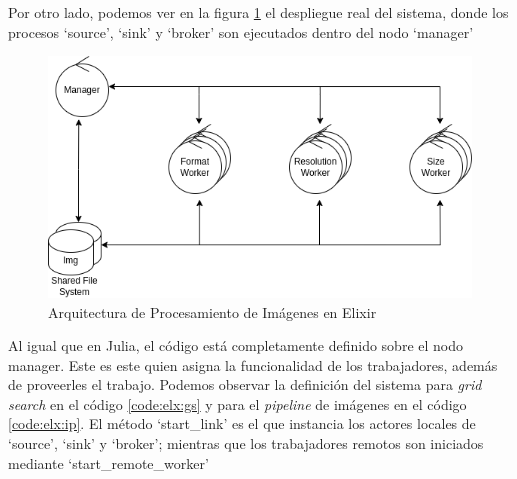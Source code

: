 \documentclass[11pt]{article}
\begin{document}
Por otro lado, podemos ver en la figura \ref{fig:elx:image_processing_arch} el despliegue real del sistema, donde los procesos `source', `sink' y `broker' son ejecutados dentro del nodo `manager'

\begin{figure}[ht]
    \centering
    \includegraphics[scale=0.4]{resources/distributed_systems/elixir/image_processing_arch.png}
    \caption{Arquitectura de Procesamiento de Imágenes en Elixir}
    \label{fig:elx:image_processing_arch}
\end{figure}

Al igual que en Julia, el código está completamente definido sobre el nodo manager. Este es este quien asigna la funcionalidad de los trabajadores, además de proveerles el trabajo. Podemos observar la definición del sistema para \textit{grid search} en el código \ref{code:elx:gs} y para el \textit{pipeline} de imágenes en el código \ref{code:elx:ip}. El método `start\_link' es el que instancia los actores locales de `source', `sink' y `broker'; mientras que los trabajadores remotos son iniciados mediante `start\_remote\_worker'
\end{document}

